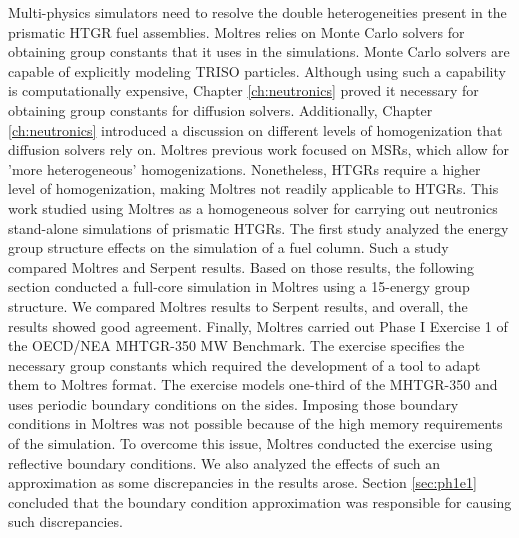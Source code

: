 Multi-physics simulators need to resolve the double heterogeneities present in the prismatic HTGR fuel assemblies.
Moltres relies on Monte Carlo solvers for obtaining group constants that it uses in the simulations.
Monte Carlo solvers are capable of explicitly modeling TRISO particles.
Although using such a capability is computationally expensive, Chapter \ref{ch:neutronics} proved it necessary for obtaining group constants for diffusion solvers.
Additionally, Chapter \ref{ch:neutronics} introduced a discussion on different levels of homogenization that diffusion solvers rely on.
Moltres previous work focused on MSRs, which allow for 'more heterogeneous' homogenizations.
Nonetheless, HTGRs require a higher level of homogenization, making Moltres not readily applicable to HTGRs.
This work studied using Moltres as a homogeneous solver for carrying out neutronics stand-alone simulations of prismatic HTGRs.
The first study analyzed the energy group structure effects on the simulation of a fuel column.
Such a study compared Moltres and Serpent results.
Based on those results, the following section conducted a full-core simulation in Moltres using a 15-energy group structure.
We compared Moltres results to Serpent results, and overall, the results showed good agreement.
Finally, Moltres carried out Phase I Exercise 1 of the OECD/NEA MHTGR-350 MW Benchmark.
The exercise specifies the necessary group constants which required the development of a tool to adapt them to Moltres format.
The exercise models one-third of the MHTGR-350 and uses periodic boundary conditions on the sides.
Imposing those boundary conditions in Moltres was not possible because of the high memory requirements of the simulation.
To overcome this issue, Moltres conducted the exercise using reflective boundary conditions.
We also analyzed the effects of such an approximation as some discrepancies in the results arose.
Section \ref{sec:ph1e1} concluded that the boundary condition approximation was responsible for causing such discrepancies.

